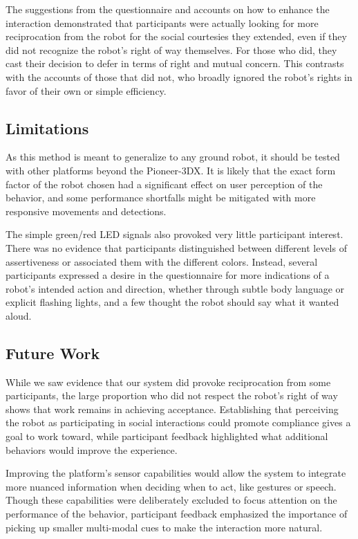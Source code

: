 \documentclass[letterpaper, 10 pt, conference]{ieeeconf}  %
\begin{document}
The suggestions from the questionnaire and accounts on how to enhance the interaction demonstrated that participants were actually looking for more reciprocation from the robot for the social courtesies they extended, even if they did not recognize the robot's right of way themselves. For those who did, they cast their decision to defer in terms of right and mutual concern. This contrasts with the accounts of those that did not, who broadly ignored the robot's rights in favor of their own or simple efficiency.

\subsection{Limitations}

As this method is meant to generalize to any ground robot, it should be tested with other platforms beyond the Pioneer-3DX. It is likely that the exact form factor of the robot chosen had a significant effect on user perception of the behavior, and some performance shortfalls might be mitigated with more responsive movements and detections. 

The simple green/red LED signals also provoked very little participant interest. There was no evidence that participants distinguished between different levels of assertiveness or associated them with the different colors. Instead, several participants expressed a desire in the questionnaire for more indications of a robot’s intended action and direction, whether through subtle body language or explicit flashing lights, and a few thought the robot should say what it wanted aloud. 

\subsection{Future Work}

While we saw evidence that our system did provoke reciprocation from some participants, the large proportion who did not respect the robot's right of way shows that work remains in achieving acceptance. Establishing that perceiving the robot as participating in social interactions could promote compliance gives a goal to work toward, while participant feedback highlighted what additional behaviors would improve the experience.

Improving the platform’s sensor capabilities would allow the system to integrate more nuanced information when deciding when to act, like gestures or speech. Though these capabilities were deliberately excluded to focus attention on the performance of the behavior, participant feedback emphasized the importance of picking up smaller multi-modal cues to make the interaction more natural.
\end{document}
